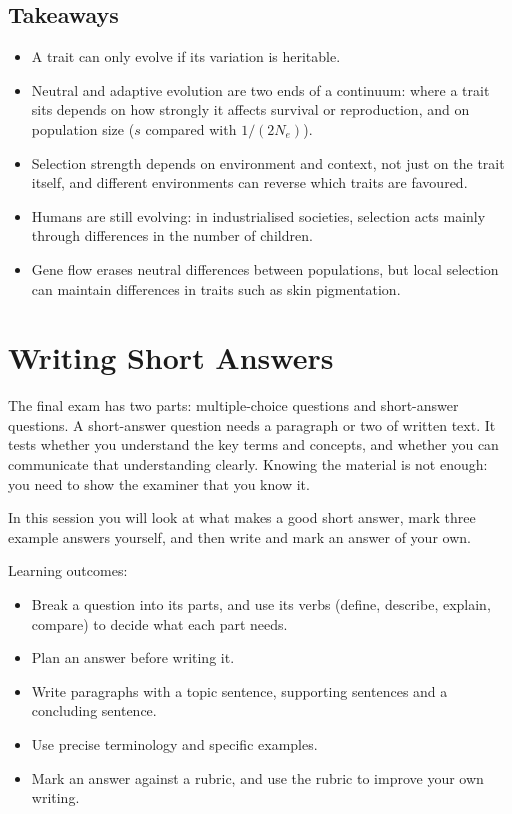 \documentclass[
  a4paper]{book}
\providecommand{\tightlist}{%
  \setlength{\itemsep}{0pt}\setlength{\parskip}{0pt}}
\begin{document}
\section{Takeaways}\label{takeaways-16}

\begin{itemize}
\tightlist
\item
  A trait can only evolve if its variation is heritable.
\item
  Neutral and adaptive evolution are two ends of a continuum: where a trait sits depends on how strongly it affects survival or reproduction, and on population size (\(s\) compared with \(1/(2N_e)\)).
\item
  Selection strength depends on environment and context, not just on the trait itself, and different environments can reverse which traits are favoured.
\item
  Humans are still evolving: in industrialised societies, selection acts mainly through differences in the number of children.
\item
  Gene flow erases neutral differences between populations, but local selection can maintain differences in traits such as skin pigmentation.
\end{itemize}

\chapter{Writing Short Answers}\label{writing-short-answers}

The final exam has two parts: multiple-choice questions and short-answer questions. A short-answer question needs a paragraph or two of written text. It tests whether you understand the key terms and concepts, and whether you can communicate that understanding clearly. Knowing the material is not enough: you need to show the examiner that you know it.

In this session you will look at what makes a good short answer, mark three example answers yourself, and then write and mark an answer of your own.

Learning outcomes:

\begin{itemize}
\tightlist
\item
  Break a question into its parts, and use its verbs (define, describe, explain, compare) to decide what each part needs.
\item
  Plan an answer before writing it.
\item
  Write paragraphs with a topic sentence, supporting sentences and a concluding sentence.
\item
  Use precise terminology and specific examples.
\item
  Mark an answer against a rubric, and use the rubric to improve your own writing.
\end{itemize}
\end{document}

